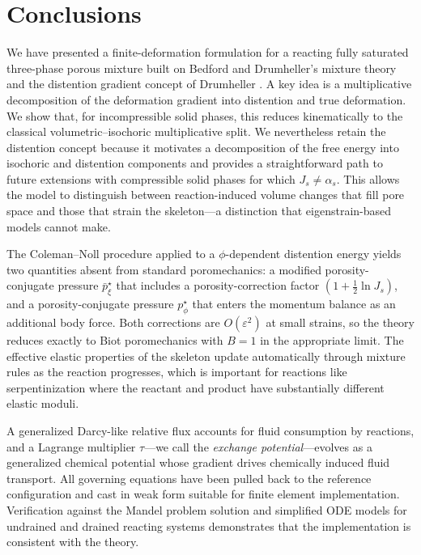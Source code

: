 \documentclass[11pt]{article}
\begin{document}
\section{Conclusions}

We have presented a finite-deformation formulation for a reacting fully saturated three-phase porous mixture built on Bedford and Drumheller's mixture theory \cite{drumheller1980thermomechanical} and the distention gradient concept of Drumheller \cite{drumheller2000}.  A key idea is a multiplicative decomposition of the deformation gradient into distention and true deformation.  We show that, for incompressible solid phases, this reduces kinematically to the classical volumetric--isochoric multiplicative split.  We nevertheless retain the distention concept because it motivates a decomposition of the free energy into isochoric and distention components and provides a straightforward path to future extensions with compressible solid phases for which $J_s \neq \alpha_s$.  This allows the model to distinguish between reaction-induced volume changes that fill pore space and those that strain the skeleton---a distinction that eigenstrain-based models cannot make.

The Coleman--Noll procedure applied to a $\phi$-dependent distention energy yields two quantities absent from standard poromechanics: a modified porosity-conjugate pressure $\bar{p}^\star_\xi$ that includes a porosity-correction factor $(1 + \frac{1}{2}\ln J_s)$, and a porosity-conjugate pressure $p^\star_\phi$ that enters the momentum balance as an additional body force.  Both corrections are $O(\varepsilon^2)$ at small strains, so the theory reduces exactly to Biot poromechanics with $B = 1$ in the appropriate limit.  The effective elastic properties of the skeleton update automatically through mixture rules as the reaction progresses, which is important for reactions like serpentinization where the reactant and product have substantially different elastic moduli.

A generalized Darcy-like relative flux accounts for fluid consumption by reactions, and a Lagrange multiplier $\tau$---we call the \emph{exchange potential}---evolves as a generalized chemical potential whose gradient drives chemically induced fluid transport.  All governing equations have been pulled back to the reference configuration and cast in weak form suitable for finite element implementation.  Verification against the Mandel problem solution and simplified ODE models for undrained and drained reacting systems demonstrates that the implementation is consistent with the theory.
\end{document}
